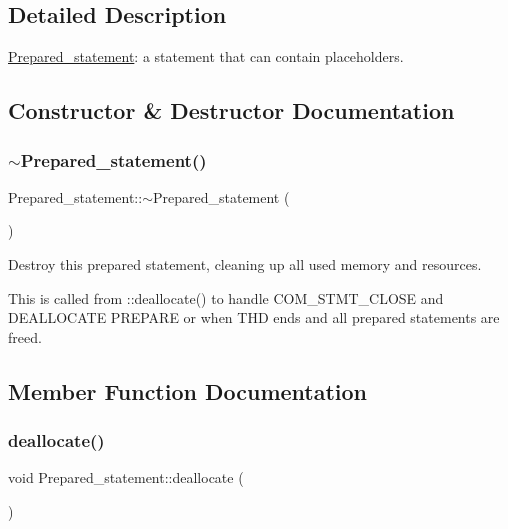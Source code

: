\subsection{Detailed Description}
\mbox{\hyperlink{classPrepared__statement}{Prepared\+\_\+statement}}\+: a statement that can contain placeholders. 

\subsection{Constructor \& Destructor Documentation}
\mbox{\label{classPrepared__statement_a3fd21faacd303bbc3c64a81d08755ab5}} 
\subsubsection{\texorpdfstring{$\sim$\+Prepared\+\_\+statement()}{~Prepared\_statement()}}
{\footnotesize\ttfamily Prepared\+\_\+statement\+::$\sim$\+Prepared\+\_\+statement (\begin{DoxyParamCaption}{ }\end{DoxyParamCaption})\hspace{0.3cm}{\ttfamily [virtual]}}

Destroy this prepared statement, cleaning up all used memory and resources.

This is called from \+::deallocate() to handle C\+O\+M\+\_\+\+S\+T\+M\+T\+\_\+\+C\+L\+O\+SE and D\+E\+A\+L\+L\+O\+C\+A\+TE P\+R\+E\+P\+A\+RE or when T\+HD ends and all prepared statements are freed. 

\subsection{Member Function Documentation}
\mbox{\label{classPrepared__statement_a3f94255f9c510ed6339d5ca8609f9003}} 
\subsubsection{\texorpdfstring{deallocate()}{deallocate()}}
{\footnotesize\ttfamily void Prepared\+\_\+statement\+::deallocate (\begin{DoxyParamCaption}{ }\end{DoxyParamCaption})}

